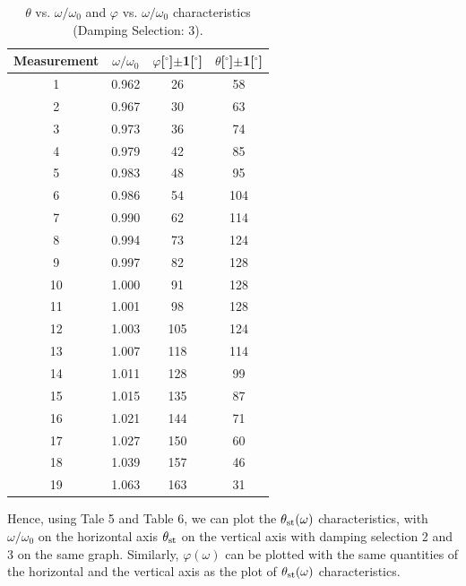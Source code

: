 \documentclass[a4paper]{report}
\begin{document}
	\begin{table}[H]
		\centering
		\begin{tabular}{|c|c|c|c|}
			\hline
			Measurement&$\omega/\omega_0$&$\varphi$[$^\circ$]$\pm$1[$^\circ$]&$\theta$[$^\circ$]$\pm$1[$^\circ$]\\
			\hline
			1     & 0.962 & 26    & 58 \\
			\hline
			2     & 0.967 & 30    & 63 \\
			\hline
			3     & 0.973 & 36    & 74 \\
			\hline
			4     & 0.979 & 42    & 85 \\
			\hline
			5     & 0.983 & 48    & 95 \\
			\hline
			6     & 0.986 & 54    & 104 \\
			\hline
			7     & 0.990 & 62    & 114 \\
			\hline
			8     & 0.994 & 73    & 124 \\
			\hline
			9     & 0.997 & 82    & 128 \\
			\hline
			10    & 1.000 & 91    & 128 \\
			\hline
			11    & 1.001 & 98    & 128 \\
			\hline
			12    & 1.003 & 105   & 124 \\
			\hline
			13    & 1.007 & 118   & 114 \\
			\hline
			14    & 1.011 & 128   & 99 \\
			\hline
			15    & 1.015 & 135   & 87 \\
			\hline
			16    & 1.021 & 144   & 71 \\
			\hline
			17    & 1.027 & 150   & 60 \\
			\hline
			18    & 1.039 & 157   & 46 \\
			\hline
			19    & 1.063 & 163   & 31 \\
			\hline
		\end{tabular}
		\caption{$\theta$ vs. $\omega/\omega_0$ and $\varphi$ vs. $\omega/\omega_0$ characteristics (Damping Selection: 3).}
	\end{table}
	
	Hence, using Tale 5 and Table 6, we can plot the $\theta_{\rm{st}}(\omega)$ characteristics, with $\omega/\omega_0$ on the horizontal axis $\theta_{\rm{st}}$ on the vertical axis with damping selection 2 and 3 on the same graph. Similarly, $\varphi(\omega)$ can be plotted with the same quantities of the horizontal and the vertical axis as the plot of $\theta_{\rm{st}}(\omega)$ characteristics.
	
\end{document}
